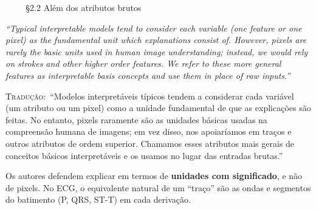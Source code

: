 \documentclass[11pt,a4paper]{article}
\newcommand{\pagechip}[1]{{\setlength{\fboxsep}{1.5pt}\colorbox{cAcc}{\textcolor{white}{\scriptsize\texttt{#1}}}}}
\newenvironment{origquote}{\par\itshape\small}{\par}
\newenvironment{tradquote}{\par\small\textsc{Tradução:}\ }{\par}
\newcommand{\explab}[1]{\par\smallskip{\small\color{cAcc}\textbf{\MakeUppercase{#1}}}\par}
\begin{document}
\begin{citacard}{\pagechip{p. 2} §2.2 Além dos atributos brutos}
\begin{origquote}“Typical interpretable models tend to consider each variable (one feature or one pixel) as the fundamental unit which explanations consist of. However, pixels are rarely the basic units used in human image understanding; instead, we would rely on strokes and other higher order features. We refer to these more general features as interpretable basis concepts and use them in place of raw inputs.”\end{origquote}
\begin{tradquote}“Modelos interpretáveis típicos tendem a considerar cada variável (um atributo ou um pixel) como a unidade fundamental de que as explicações são feitas. No entanto, pixels raramente são as unidades básicas usadas na compreensão humana de imagens; em vez disso, nos apoiaríamos em traços e outros atributos de ordem superior. Chamamos esses atributos mais gerais de conceitos básicos interpretáveis e os usamos no lugar das entradas brutas.”\end{tradquote}
\explab{Explicação}
Os autores defendem explicar em termos de \textbf{unidades com significado}, e não de pixels. No ECG, o equivalente natural de um “traço” são as ondas e segmentos do batimento (P, QRS, ST-T) em cada derivação.
\end{citacard}
\end{document}
